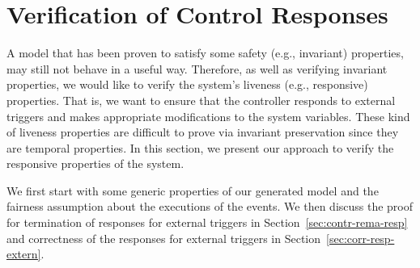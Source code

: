 \section{Verification of Control Responses}
\label{sec:verificationResponses}

A model that has been proven to satisfy some safety (e.g., invariant)
properties, may still not behave in a useful way.  Therefore, as well
as verifying invariant properties, we would like to verify the
system's liveness (e.g., responsive) properties. That is, we want to
ensure that the controller responds to external triggers and makes
appropriate modifications to the system variables.  These kind of
liveness properties are difficult to prove via invariant preservation
since they are temporal properties.  In this section, we present our
approach to verify the responsive properties of the system.

We first start with some generic properties of our generated \EventB
model and the fairness assumption about the executions of the events.
We then discuss the proof for termination of responses for external
triggers in Section~\ref{sec:contr-rema-resp} and correctness of the
responses for external triggers in Section~\ref{sec:corr-resp-extern}.

